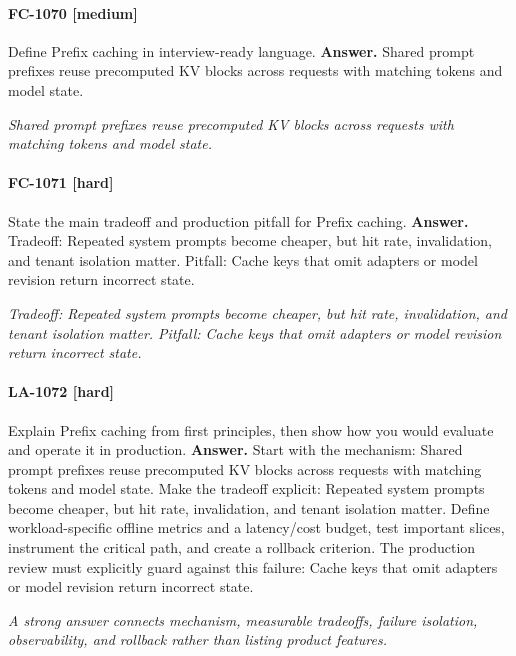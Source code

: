 \paragraph{FC-1070 [medium]} Define Prefix caching in interview-ready language.
\noindent\textbf{Answer.} Shared prompt prefixes reuse precomputed KV blocks across requests with matching tokens and model state.
\par\textit{Shared prompt prefixes reuse precomputed KV blocks across requests with matching tokens and model state.}
\paragraph{FC-1071 [hard]} State the main tradeoff and production pitfall for Prefix caching.
\noindent\textbf{Answer.} Tradeoff: Repeated system prompts become cheaper, but hit rate, invalidation, and tenant isolation matter. Pitfall: Cache keys that omit adapters or model revision return incorrect state.
\par\textit{Tradeoff: Repeated system prompts become cheaper, but hit rate, invalidation, and tenant isolation matter. Pitfall: Cache keys that omit adapters or model revision return incorrect state.}
\paragraph{LA-1072 [hard]} Explain Prefix caching from first principles, then show how you would evaluate and operate it in production.
\noindent\textbf{Answer.} Start with the mechanism: Shared prompt prefixes reuse precomputed KV blocks across requests with matching tokens and model state. Make the tradeoff explicit: Repeated system prompts become cheaper, but hit rate, invalidation, and tenant isolation matter. Define workload-specific offline metrics and a latency/cost budget, test important slices, instrument the critical path, and create a rollback criterion. The production review must explicitly guard against this failure: Cache keys that omit adapters or model revision return incorrect state.
\par\textit{A strong answer connects mechanism, measurable tradeoffs, failure isolation, observability, and rollback rather than listing product features.}
